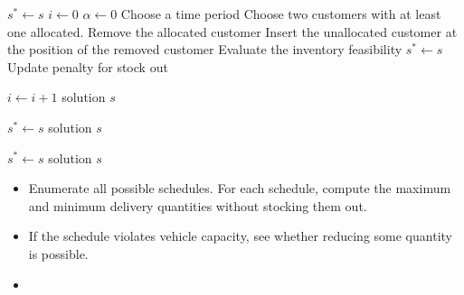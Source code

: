 \documentclass{article}
\begin{document}
\begin{algorithm}[H]
\caption{\textbf{Local Search(s)}}
\begin{algorithmic}[1]
\STATE $s^*\gets s$
\STATE $i\gets 0$
\STATE $\alpha \gets 0$
    \STATE Choose a time period
    \STATE Choose two customers with at least one allocated.
    \STATE Remove the allocated customer
    \STATE Insert the unallocated customer at the position of the removed customer
    \STATE Evaluate the inventory feasibility
        \STATE $s^*\gets s$
    \ENDIF
    \ENDWHILE
    \STATE Update penalty for stock out
  
    \STATE $i\gets i+1$
\ENDWHILE
\RETURN solution $s$
\end{algorithmic}
\end{algorithm}



\begin{algorithm}[H]
\caption{\textbf{Neighbourhood operator without rebalance}}
\begin{algorithmic}[1]
\STATE $s^*\gets s$
\RETURN solution $s$
\end{algorithmic}
\end{algorithm}


\begin{algorithm}[H]
\caption{\textbf{Neighbourhood operator with rebalance}}
\begin{algorithmic}[1]
\STATE $s^*\gets s$
\RETURN solution $s$
\end{algorithmic}
\end{algorithm}

\begin{itemize}
    \item Enumerate all possible schedules. For each schedule, compute the maximum and minimum delivery quantities without stocking them out.
    \item If the schedule violates vehicle capacity, see whether reducing some quantity is possible.
    \item 
\end{itemize}
\end{document}
